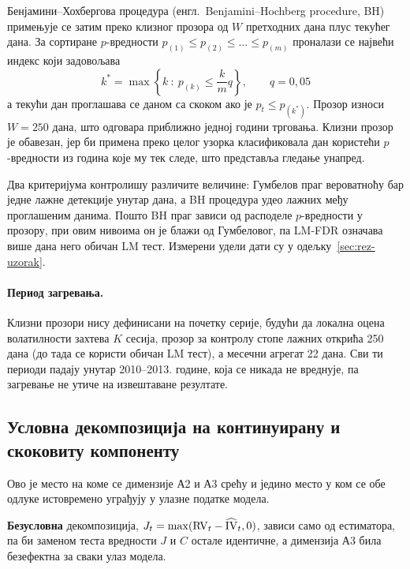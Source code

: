 Бенјамини–\hspace{0pt}Хохбергова процедура (енгл.\ Benjamini--\hspace{0pt}Hochberg
procedure, BH) \parencite{benjaminiHochberg1995} примењује се затим
преко клизног прозора од $W$ претходних дана плус текућег дана. За сортиране
$p$-\hspace{0pt}вредности $p_{(1)} \le p_{(2)} \le \dots \le p_{(m)}$ проналази се највећи индекс
који задовољава
\begin{equation}
k^{*} = \max\left\{k\ :\ p_{(k)} \le \frac{k}{m}q\right\},
\qquad q = 0{,}05
\end{equation}
а текући дан проглашава се даном са скоком ако је $p_t \le p_{(k^{*})}$. Прозор износи
$W = 250$ дана, што одговара приближно једној години трговања. Клизни прозор је
обавезан, јер би примена преко целог узорка класификовала дан користећи $p$-вредности из
година које му тек следе, што представља гледање унапред.

Два критеријума контролишу различите величине: Гумбелов праг вероватноћу бар једне
лажне детекције унутар дана, а BH процедура удео лажних међу
проглашеним данима. Пошто BH праг зависи од расподеле $p$-вредности у прозору, при
овим нивоима он је блажи од Гумбеловог, па LM-FDR означава више дана него обичан LM
тест. Измерени удели дати су у одељку~\ref{sec:rez-uzorak}.

\paragraph{Период загревања.}
Клизни прозори нису дефинисани на почетку серије, будући да локална оцена волатилности захтева
$K$ сесија, прозор за контролу стопе лажних открића 250 дана (до тада се користи обичан
LM тест), а месечни агрегат 22 дана. Сви ти периоди падају унутар 2010–2013. године,
која се никада не вреднује, па загревање не утиче на извештаване резултате.

\subsection{Условна декомпозиција на континуирану и скоковиту компоненту}
\label{subsec:decompose}

Ово је место на коме се димензије А2 и А3 срећу и једино место у ком се обе одлуке
истовремено уграђују у улазне податке модела.

\textbf{Безусловна} декомпозиција, $J_t = \max(\mathrm{RV}_t - \widehat{\mathrm{IV}}_t, 0)$, зависи само од
естиматора, па би заменом теста вредности $J$ и $C$ остале идентичне, а димензија А3
била безефектна за сваки улаз модела.

